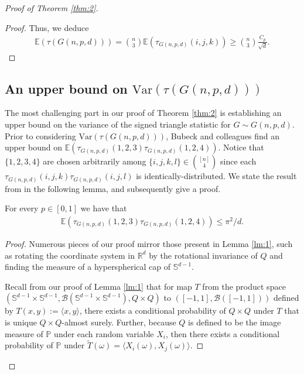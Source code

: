 \documentclass{article}
\newenvironment{manuallemma}[1]{%
  \renewcommand\themanuallemmainner{#1}%
  \manuallemmainner
}{\endmanualtheoreminner}
\begin{document}
\begin{proof}[Proof of Theorem \ref{thm:2}]
\begin{proof}
Thus, we deduce 
\begin{align}
     \mathbb{E} \left(\tau(G(n,p,d)) \right) = \binom{n}{3} \mathbb{E} \left( \tau_{G(n,p,d)}(i,j,k) \right) \geq \binom{n}{3}\frac{C_p}{\sqrt{d}}\label{eq24}.
\end{align}
\end{proof}

\subsection{An upper bound on $\text{Var}(\tau(G(n,p,d)))$}
The most challenging part in our proof of Theorem \ref{thm:2} is establishing an upper bound on the variance of the signed triangle statistic for $G \sim G(n,p,d)$. Prior to considering $\text{Var}(\tau(G(n,p,d)))$, Bubeck and colleagues find an upper bound on $\mathbb{E}\left(\tau_{G(n,p,d)}(1,2,3)\tau_{G(n,p,d)}(1,2,4) \right)$. Notice that $\{1,2, 3,4\}$ are chosen arbitrarily among $\{i,j,k,l\} \in \binom{[n]}{4}$ since each  $\tau_{G(n,p,d)}(i,j,k)\tau_{G(n,p,d)}(i,j,l)$ is identically-distributed. We state the result from \cite{bubeck2016testing} in the following lemma, and subsequently give a proof.

\begin{manuallemma}{4} \label{lm:4}
    For every $p \in [0,1]$ we have that 
    \begin{align*}
        \mathbb{E}\left( \tau_{G(n,p,d)}(1,2,3)\tau_{G(n,p,d)}(1,2,4) \right) \leq \pi^2/d.
    \end{align*}
\end{manuallemma}

\begin{proof}
Numerous pieces of our proof mirror those present in Lemma \ref{lm:1}, such as rotating the coordinate system in $\mathbb{R}^d$ by the rotational invariance of $Q$ and finding the measure of a hyperspherical cap of $\mathbb{S}^{d-1}$.

Recall from our proof of Lemma \ref{lm:1} that for map $T$ from the product space $(\mathbb{S}^{d-1} \times \mathbb{S}^{d-1}, \mathcal{B}(\mathbb{S}^{d-1} \times \mathbb{S}^{d-1}), Q \times Q)$ to $([-1,1], \mathcal{B}([-1,1]))$ defined by $T(x,y) := \langle x, y \rangle$, there exists a conditional probability of $Q \times Q$ under $T$ that is unique $Q \times Q$-almost surely. Further, because $Q$ is defined to be the image measure of $\mathbb{P}$ under each random variable $X_i$, then there exists a conditional probability of $\mathbb{P}$ under $\widetilde{T}(\omega) = \langle X_i (\omega), X_j(\omega) \rangle.$ 


\end{proof}
\end{proof}
\end{document}

